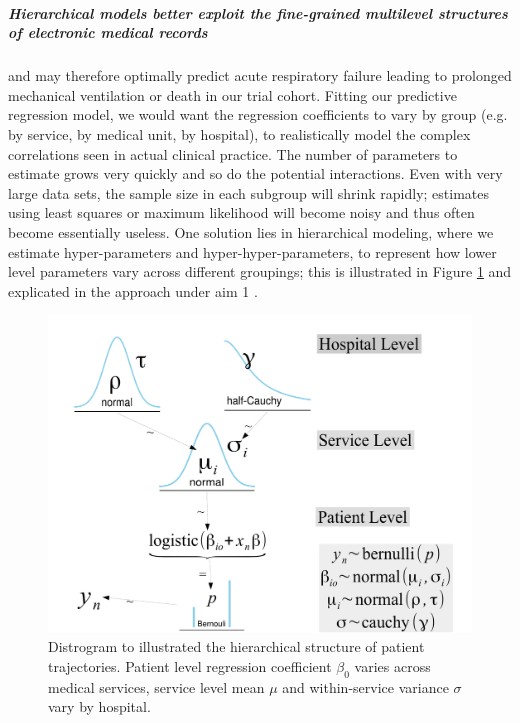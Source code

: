 \documentclass[11pt,notitlepage]{article}
\begin{document}
\subparagraph*{Hierarchical models better exploit the fine-grained multilevel structures of electronic medical records} and may therefore optimally predict acute respiratory failure leading to prolonged mechanical ventilation or death in our trial cohort. Fitting our predictive regression model, we would want the regression coefficients to vary by group (e.g. by service, by medical unit, by hospital), to realistically model the complex correlations seen in actual clinical practice. The number of parameters to estimate grows very quickly and so do the potential interactions. Even with very large data sets, the sample size in each subgroup will shrink rapidly; estimates using least squares or maximum likelihood will become noisy and thus often become essentially useless. One solution lies in hierarchical modeling, where we estimate hyper-parameters and hyper-hyper-parameters, to represent how lower level parameters vary across different groupings; this is illustrated in Figure \ref{fig:Distrogram} and explicated in the approach under aim 1 \cite{Bafumi_Gelman_2007}. 

\begin{figure} %
 \vspace{-20pt}
 \includegraphics[scale=0.3]{Figures/Distrogram.pdf} 
  \vspace{-10pt}
 \caption{\footnotesize Distrogram to illustrated the hierarchical structure of patient trajectories. Patient level regression coefficient $\beta_0$ varies across medical services, service level mean $\mu$ and within-service variance $\sigma$ vary by hospital. }
 \vspace{-10pt}
 \label{fig:Distrogram}
\end{figure} 
\end{document}
